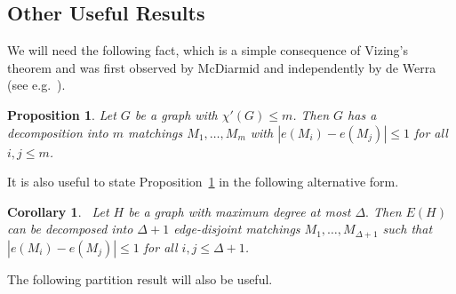 \documentclass{memo-l}
\newtheorem{prop}[firstthm]{Proposition}
\newtheorem{cor}[firstthm]{Corollary}
\def\COMMENT#1{}
\numberwithin{section}{chapter}
\numberwithin{equation}{section}
\numberwithin{firstthm}{section}
\numberwithin{figure}{section}
\begin{document}
\subsection{Other Useful Results}
We will need the following fact, which is a simple consequence of 
Vizing's theorem and was first observed by McDiarmid and independently by de Werra (see e.g.~\cite{west}).%
\COMMENT{no need for original references as it's not that deep...
osthus deleted the reference to a proof in paperII , as it's been deleted there}

\begin{prop} \label{prop:matchingdecomposition}
Let $G$ be a graph with $\chi '(G) \le m $. Then $G$ has a decomposition into $m$ matchings $M_1, \dots ,M_m$
with $|e(M_i) - e(M_j)| \le 1$ for all $i, j  \le m$.
\end{prop}
It is also useful to state Proposition~\ref{prop:matchingdecomposition} in the following alternative form.
\begin{cor}\label{basic_matching_dec}\
 Let $H$ be a graph with maximum degree at most $\Delta.$
Then $E(H)$ can be decomposed into $\Delta+1$ edge-disjoint matchings $M_1, \ldots, M_{\Delta+1}$
such that $|e(M_i)-e(M_j)|\le 1$ for all $i, j\le \Delta+1$.
\end{cor}




The following partition result will also be useful.
\end{document}
